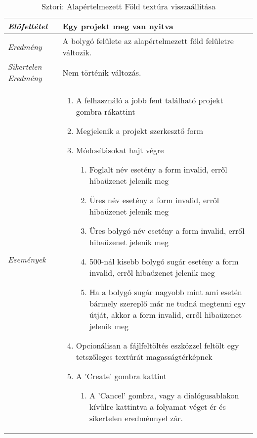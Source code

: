 \begin{table}[H]
	\centering
	\begin{tabular}{ | m{} | m{} | }
		\hline
		\emph{Előfeltétel} & Egy projekt meg van nyitva  \\
		\hline
		\emph{Eredmény} & A bolygó felülete az alapértelmezett föld felületre változik.    \\
		\emph{Sikertelen Eredmény} & Nem történik változás.  \\
		\hline
		\hline
		\emph{Események} &

		\begin{enumerate}
			\item A felhasználó a jobb fent található projekt gombra rákattint
			\item Megjelenik a projekt szerkesztő form
			\item Módosításokat hajt végre
			\begin{enumerate}
				\item Foglalt név esetény a form invalid, erről hibaüzenet jelenik meg
				\item Üres név esetény a form invalid, erről hibaüzenet jelenik meg
				\item Üres bolygó név esetény a form invalid, erről hibaüzenet jelenik meg
				\item 500-nál kisebb bolygó sugár esetény a form invalid, erről hibaüzenet jelenik meg
				\item Ha a bolygó sugár nagyobb mint ami esetén bármely szereplő már ne tudná megtenni egy útját, akkor a form invalid, erről hibaüzenet jelenik meg
			\end{enumerate}
			\item Opcionálisan a fájlfeltöltés eszközzel feltölt egy tetszőleges textúrát magasságtérképnek
			\item A 'Create' gombra kattint
			\begin{enumerate}
				\item A 'Cancel' gombra, vagy a dialógusablakon kívülre kattintva a folyamat véget ér és sikertelen eredménnyel zár.
			\end{enumerate}
		\end{enumerate}

		\\
		\hline
	\end{tabular}
	\caption{Sztori: Alapértelmezett Föld textúra visszaállítása}
	\label{tab:story-project-edit-earth-texture}
\end{table}

